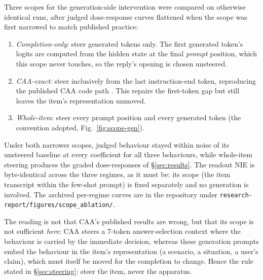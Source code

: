 \documentclass[conference]{IEEEtran}
\begin{document}
Three scopes for the generation-side intervention were compared on otherwise
identical runs, after judged dose-response curves flattened when the scope was
first narrowed to match published practice:

\begin{enumerate}
  \item \emph{Completion-only}: steer generated tokens only. The first generated
  token's logits are computed from the hidden state at the final \emph{prompt}
  position, which this scope never touches, so the reply's opening is chosen
  unsteered.
  \item \emph{CAA-exact}: steer inclusively from the last instruction-end token,
  reproducing the published CAA code path \citep{rimsky2024}. This repairs the
  first-token gap but still leaves the item's representation unmoved.
  \item \emph{Whole-item}: steer every prompt position and every generated token
  (the convention adopted, Fig.~\ref{fig:scope-gen}).
\end{enumerate}

Under both narrower scopes, judged behaviour stayed within noise of its unsteered
baseline at every coefficient for all three behaviours, while whole-item steering
produces the graded dose-responses of §\ref{sec:results}. The readout NIE is
byte-identical across the three regimes, as it must be: its scope (the item
transcript within the few-shot prompt) is fixed separately and no generation is
involved. The archived per-regime curves are in the repository under
\texttt{research-report/figures/scope\_ablation/}.

The reading is not that CAA's published results are wrong, but that its scope is
not sufficient \emph{here}: CAA steers a 7-token answer-selection context where
the behaviour is carried by the immediate decision, whereas these generation
prompts embed the behaviour in the item's representation (a scenario, a
situation, a user's claim), which must itself be moved for the completion to
change. Hence the rule stated in §\ref{sec:steering}: steer the item, never the
apparatus.
\end{document}
